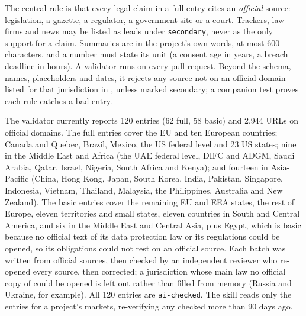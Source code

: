 \documentclass[11pt,a4paper]{article}
\DeclareRobustCommand{\fpath}[1]{\path{#1}}
\begin{document}
The central rule is that every legal claim in a full entry cites an \emph{official} source: legislation, a gazette, a
regulator, a government site or a court. Trackers, law firms and news may be listed as leads under \texttt{secondary},
never as the only support for a claim. Summaries are in the project's own words, at most 600 characters, and a number
must state its unit (a consent age in years, a breach deadline in hours). A validator runs on every pull request. Beyond the
schema, names, placeholders and dates, it rejects any source not on an official domain listed for that jurisdiction in
\fpath{watch/sources.yaml}, unless marked secondary; a companion test proves each rule catches a bad entry.

The validator currently reports 120 entries (62 full, 58 basic) and 2,944 URLs on official domains. The full entries
cover the EU and ten European countries; Canada and Quebec, Brazil, Mexico, the US federal level and 23 US states; nine in
the Middle East and Africa (the UAE federal level, DIFC and ADGM, Saudi Arabia, Qatar, Israel, Nigeria, South Africa and
Kenya); and fourteen in Asia-Pacific (China, Hong Kong, Japan, South Korea, India, Pakistan, Singapore, Indonesia, Vietnam,
Thailand, Malaysia, the Philippines, Australia and New Zealand). The basic entries cover the remaining EU and EEA states,
the rest of Europe, eleven territories and small states, eleven countries in South and Central America, and six in the
Middle East and Central Asia, plus Egypt, which is basic because no official text of its data protection law or its
regulations could be opened, so its obligations could not rest on an official source. Each batch was written from official
sources, then checked by an independent reviewer who re-opened every source, then corrected; a jurisdiction whose main law
no official copy of could be opened is left out rather than filled from memory (Russia and Ukraine, for example). All 120
entries are \texttt{ai-checked}. The skill reads only the entries for a project's markets, re-verifying any checked more
than 90 days ago.
\end{document}
